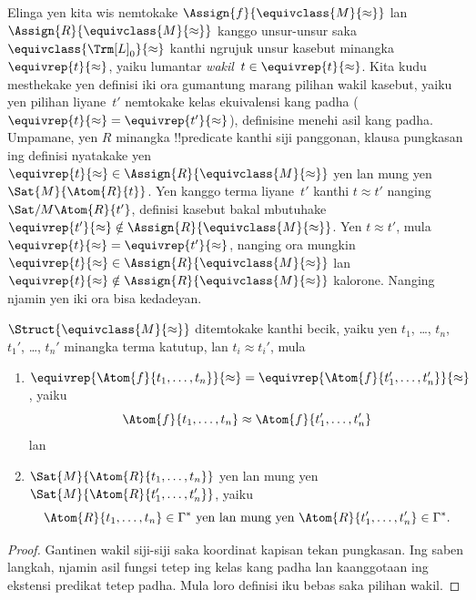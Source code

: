 \documentclass[../../../include/open-logic-section]{subfiles}
\begin{document}
\begin{explain}
Elinga yen kita wis nemtokake $\Assign{f}{\equivclass{M}{\approx}}$
lan $\Assign{R}{\equivclass{M}{\approx}}$ kanggo unsur-unsur saka
$\equivclass{{\Trm[L]}_0}{\approx}$ kanthi ngrujuk unsur kasebut minangka
$\equivrep{t}{\approx}$, yaiku lumantar
\emph{wakil}~$t \in \equivrep{t}{\approx}$. Kita kudu mesthekake yen
definisi iki ora gumantung marang pilihan wakil kasebut, yaiku yen
pilihan liyane~$t'$ nemtokake kelas ekuivalensi kang padha
($\equivrep{t}{\approx} = \equivrep{t'}{\approx}$), definisine menehi
asil kang padha. Umpamane, yen $R$ minangka !!{predicate} kanthi siji
panggonan, klausa pungkasan ing definisi nyatakake yen
$\equivrep{t}{\approx} \in \Assign{R}{\equivclass{M}{\approx}}$ yen lan
mung yen $\Sat{M}{\Atom{R}{t}}$. Yen kanggo terma liyane~$t'$ kanthi
$t \approx t'$ nanging $\Sat/{M}{\Atom{R}{t'}}$, definisi kasebut
bakal mbutuhake $\equivrep{t'}{\approx} \notin
\Assign{R}{\equivclass{M}{\approx}}$. Yen $t \approx t'$, mula
$\equivrep{t}{\approx} = \equivrep{t'}{\approx}$, nanging ora mungkin
$\equivrep{t}{\approx} \in \Assign{R}{\equivclass{M}{\approx}}$ lan
$\equivrep{t}{\approx} \notin
\Assign{R}{\equivclass{M}{\approx}}$ kalorone. Nanging
 njamin yen iki ora bisa kedadeyan.
\end{explain}

\begin{prop}
$\Struct{\equivclass{M}{\approx}}$ ditemtokake kanthi becik, yaiku yen
$t_1$, \dots, $t_n$, $t_1'$, \dots, $t_n'$ minangka terma katutup, lan
$t_i \approx t_i'$, mula
\begin{enumerate}
\item $\equivrep{\Atom{f}{t_1,\dots, t_n}}{\approx} =
    \equivrep{\Atom{f}{t_1',\dots, t_n'}}{\approx}$, yaiku
  \[
  \Atom{f}{t_1,\dots, t_n} \approx \Atom{f}{t_1',\dots, t_n'}
  \]
  lan
\item $\Sat{M}{\Atom{R}{t_1,\dots, t_n}}$ yen lan mung yen
  $\Sat{M}{\Atom{R}{t_1',\dots, t_n'}}$, yaiku
  \[
    \Atom{R}{t_1,\dots, t_n} \in \Gamma^* \text{ yen lan mung yen }
    \Atom{R}{t_1',\dots, t_n'} \in \Gamma^*.
  \]
\end{enumerate}
\end{prop}

\begin{proof}
Gantinen wakil siji-siji saka koordinat kapisan tekan pungkasan.
Ing saben langkah,  njamin asil fungsi
tetep ing kelas kang padha lan kaanggotaan ing ekstensi predikat
tetep padha. Mula loro definisi iku bebas saka pilihan wakil.
\end{proof}
\end{document}
